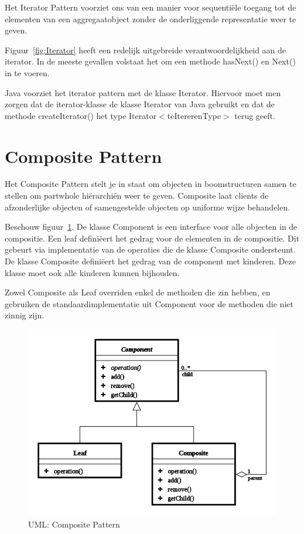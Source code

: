 \documentclass[a4paper,12pt]{article}
\begin{document}
Het Iterator Pattern voorziet ons van een manier voor sequentiële toegang tot de elementen van een aggregaatobject zonder de onderliggende representatie weer te geven.

Figuur~\ref{fig:Iterator} heeft een redelijk uitgebreide verantwoordelijkheid aan de iterator. In de meeste gevallen volstaat het om een methode hasNext() en Next() in te voeren.

Java voorziet het iterator pattern met de klasse Iterator.
Hiervoor moet men zorgen dat de iterator-klasse de klasse Iterator van Java gebruikt en dat de methode createIterator() het type Iterator$<$teItererenType$>$ terug geeft.

\section{Composite Pattern}
Het Composite Pattern stelt je in staat om objecten in boomstructuren samen te stellen om partwhole hiërarchiën weer te geven.
Composite laat clients de afzonderlijke objecten of samengestelde objecten op uniforme wijze behandelen.

Beschouw figuur~\ref{fig:Composite}.
De klasse Component is een interface voor alle objecten in de compositie.
Een leaf definiëert het gedrag voor de elementen in de compositie.
Dit gebeurt via implementatie van de operaties die de klasse Composite ondersteunt.
De klasse Composite definiëert het gedrag van de component met kinderen. Deze klasse moet ook alle kinderen kunnen bijhouden.

Zowel Composite als Leaf overriden enkel de methoden die zin hebben, en gebruiken de standaardimplementatie uit Component voor de methoden die niet zinnig zijn.

\begin{figure}[H]
\centering
  	\includegraphics[width=.7\linewidth]{img/Composite.png}
  	\caption{UML: Composite Pattern}
  	\label{fig:Composite}
\end{figure}
\end{document}
